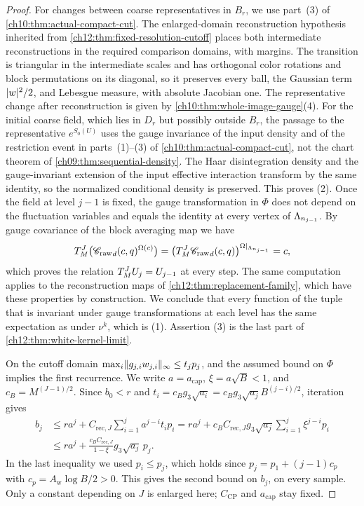 \begin{proof}
For changes between coarse representatives in $B_r$, we use part~(3) of \cref{ch10:thm:actual-compact-cut}. The enlarged-domain reconstruction hypothesis inherited from \cref{ch12:thm:fixed-resolution-cutoff} places both intermediate reconstructions in the required comparison domains, with margins. The transition is triangular in the intermediate scales and has orthogonal color rotations and block permutations on its diagonal, so it preserves every ball, the Gaussian term $\lvert w\rvert^2/2$, and Lebesgue measure, with absolute Jacobian one. The representative change after reconstruction is given by \cref{ch10:thm:whole-image-gauge}(4). For the initial coarse field, which lies in $D_r$ but possibly outside $B_r$, the passage to the representative $e^{S_0(U)}$ uses the gauge invariance of the input density and of the restriction event in parts~(1)--(3) of \cref{ch10:thm:actual-compact-cut}, not the chart theorem of \cref{ch09:thm:sequential-density}. The Haar disintegration density and the gauge-invariant extension of the input effective interaction transform by the same identity, so the normalized conditional density is preserved. This proves (2). Once the field at level $j-1$ is fixed, the gauge transformation in $\Phi$ does not depend on the fluctuation variables and equals the identity at every vertex of $\Lambda_{n_{j-1}}$. By gauge covariance of the block averaging map we have
\[
 T_M^J\bigl({\mathscr C_{\mathrm{raw}}}_d(c,q)^{\Omega(c)}\bigr)=\bigl(T_M^J{\mathscr C_{\mathrm{raw}}}_d(c,q)\bigr)^{\Omega|_{\Lambda_{n_{j-1}}}}=c,
\]
which proves the relation $T_M^J U_j=U_{j-1}$ at every step. The same computation applies to the reconstruction maps of \cref{ch12:thm:replacement-family}, which have these properties by construction. We conclude that every function of the tuple that is invariant under gauge transformations at each level has the same expectation as under $\nu^k$, which is (1). Assertion (3) is the last part of \cref{ch12:thm:white-kernel-limit}.

On the cutoff domain $\max_i\lVert g_{j,i}w_{j,i}\rVert_\infty\le t_jp_j$, and the assumed bound on $\Phi$ implies the first recurrence. We write $a=a_{\mathrm{cap}}$, $\xi=a\sqrt B<1$, and $c_B=M^{(J-1)/2}$. Since $b_0<r$ and $t_i=c_Bg_3\sqrt{a_i}=c_Bg_3\sqrt{a_j}B^{(j-i)/2}$, iteration gives
\begin{equation}
 \begin{split}
 b_j&\le ra^j+C_{\mathrm{rec},J}\sum_{i=1}^ja^{j-i}t_ip_i
 =ra^j+c_BC_{\mathrm{rec},J}g_3\sqrt{a_j}\sum_{i=1}^j\xi^{j-i}p_i\\
 &\le ra^j+\frac{c_BC_{\mathrm{rec},J}}{1-\xi}g_3\sqrt{a_j}\,p_j .
 \end{split}\label{ch12:eq:cap-iteration}
\end{equation}
In the last inequality we used $p_i\le p_j$, which holds since $p_j=p_1+(j-1)c_p$ with $c_p=A_{\mathrm w}\log B/2>0$. This gives the second bound on $b_j$, on every sample. Only a constant depending on $J$ is enlarged here; $C_{\mathrm{CP}}$ and $a_{\mathrm{cap}}$ stay fixed.


\end{proof}
